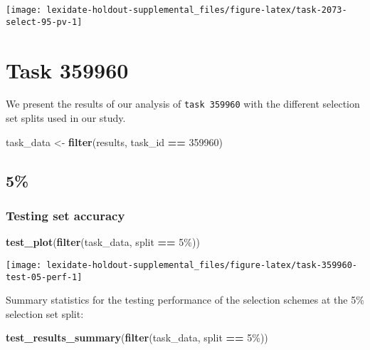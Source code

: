 \documentclass[
]{book}
\newenvironment{Shaded}{\begin{snugshade}}{\end{snugshade}}
\newcommand{\DecValTok}[1]{\textcolor[rgb]{0.00,0.00,0.81}{#1}}
\newcommand{\FunctionTok}[1]{\textcolor[rgb]{0.13,0.29,0.53}{\textbf{#1}}}
\newcommand{\NormalTok}[1]{#1}
\newcommand{\OtherTok}[1]{\textcolor[rgb]{0.56,0.35,0.01}{#1}}
\newcommand{\SpecialCharTok}[1]{\textcolor[rgb]{0.81,0.36,0.00}{\textbf{#1}}}
\newcommand{\StringTok}[1]{\textcolor[rgb]{0.31,0.60,0.02}{#1}}
\begin{document}
\texttt{[image: lexidate-holdout-supplemental\_files/figure-latex/task-2073-select-95-pv-1]}

\hypertarget{task-359960}{%
\chapter{Task 359960}\label{task-359960}}

We present the results of our analysis of \texttt{task\ 359960} with the different selection set splits used in our study.

\begin{Shaded}
\begin{Highlighting}[]
\NormalTok{task\_data }\OtherTok{\textless{}{-}} \FunctionTok{filter}\NormalTok{(results, task\_id }\SpecialCharTok{==} \DecValTok{359960}\NormalTok{)}
\end{Highlighting}
\end{Shaded}

\hypertarget{section-45}{%
\section{5\%}\label{section-45}}

\hypertarget{testing-set-accuracy-45}{%
\subsection{Testing set accuracy}\label{testing-set-accuracy-45}}

\begin{Shaded}
\begin{Highlighting}[]
\FunctionTok{test\_plot}\NormalTok{(}\FunctionTok{filter}\NormalTok{(task\_data, split }\SpecialCharTok{==} \StringTok{\textquotesingle{}5\%\textquotesingle{}}\NormalTok{))}
\end{Highlighting}
\end{Shaded}

\texttt{[image: lexidate-holdout-supplemental\_files/figure-latex/task-359960-test-05-perf-1]}

Summary statistics for the testing performance of the selection schemes at the 5\% selection set split:

\begin{Shaded}
\begin{Highlighting}[]
\FunctionTok{test\_results\_summary}\NormalTok{(}\FunctionTok{filter}\NormalTok{(task\_data, split }\SpecialCharTok{==} \StringTok{\textquotesingle{}5\%\textquotesingle{}}\NormalTok{))}
\end{Highlighting}
\end{Shaded}
\end{document}
